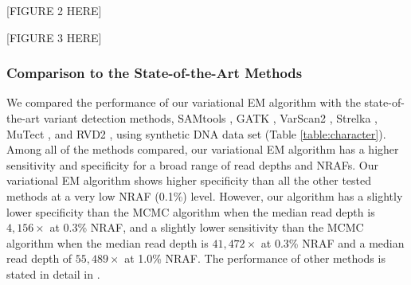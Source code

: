 \documentclass{bmcart}
\begin{document}
\vspace{2em}
\begin{center}
[FIGURE 2 HERE]  
\end{center}
\vspace{2em}

\vspace{2em}
\begin{center}
[FIGURE 3 HERE]  
\end{center}
\vspace{2em}

\subsubsection{Comparison to the State-of-the-Art Methods}
We compared the performance of our variational EM algorithm with the state-of-the-art variant detection methods, SAMtools \cite{li2009sequence}, GATK \cite{mckenna2010genome}, VarScan2 \cite{koboldt2012varscan}, Strelka \cite{saunders2012strelka}, MuTect \cite{cibulskis2013sensitive}, and RVD2 \cite{he2015rvd2}, using synthetic DNA data set (Table \ref{table:character}).
Among all of the methods compared, our variational EM algorithm has a higher sensitivity and specificity for a broad range of read depths and NRAFs.
Our variational EM algorithm shows higher specificity than all the other tested methods at a very low NRAF (0.1\%) level.
However, our algorithm has a slightly lower specificity than the MCMC algorithm when the median read depth is $4,156\times$ at 0.3\% NRAF, and a slightly lower sensitivity than the MCMC algorithm when the median read depth is $41,472\times$ at 0.3\% NRAF and a median read depth of $55,489\times$ at 1.0\% NRAF.
The performance of other methods is stated in detail in \cite{he2015rvd2}.
\end{document}
